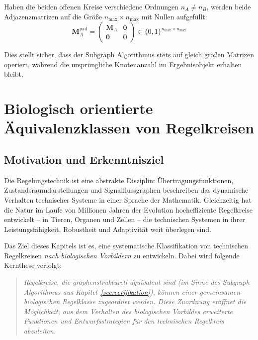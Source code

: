 \documentclass[a4paper,12pt]{article}
\theoremstyle{definition}
\begin{document}
Haben die beiden offenen Kreise verschiedene Ordnungen $n_A \neq n_B$,
werden beide Adjazenzmatrizen auf die Größe $n_{\max} \times n_{\max}$
mit Nullen aufgefüllt:
\[
\mathbf{M}_A^{\mathrm{pad}} = \begin{pmatrix} \mathbf{M}_A & \mathbf{0} \\ \mathbf{0} & \mathbf{0} \end{pmatrix} \in \{0,1\}^{n_{\max} \times n_{\max}}
\]

Dies stellt sicher, dass der Subgraph Algorithmus stets auf gleich großen
Matrizen operiert, während die ursprüngliche Knotenanzahl im Ergebnisobjekt
erhalten bleibt.

\section{Biologisch orientierte Äquivalenzklassen von Regelkreisen}
\label{sec:bio_aequivalenz}

\subsection{Motivation und Erkenntnisziel}

Die Regelungstechnik ist eine abstrakte Disziplin: Übertragungsfunktionen,
Zustandsraumdarstellungen und Signalflussgraphen beschreiben das dynamische
Verhalten technischer Systeme in einer Sprache der Mathematik. Gleichzeitig hat
die Natur im Laufe von Millionen Jahren der Evolution hocheffiziente Regelkreise
entwickelt -- in Tieren, Organen und Zellen -- die technischen Systemen in ihrer
Leistungsfähigkeit, Robustheit und Adaptivität weit überlegen sind.

Das Ziel dieses Kapitels ist es, eine systematische Klassifikation von
technischen Regelkreisen \emph{nach biologischen Vorbildern} zu entwickeln.
Dabei wird folgende Kernthese verfolgt:

\begin{quote}
	\textit{Regelkreise, die graphenstrukturell äquivalent sind (im Sinne des
		Subgraph Algorithmus aus Kapitel~\ref{sec:verifikation}), können einer
		gemeinsamen biologischen Regelklasse zugeordnet werden. Diese Zuordnung
		eröffnet die Möglichkeit, aus dem Verhalten des biologischen Vorbildes
		erweiterte Funktionen und Entwurfsstrategien für den technischen Regelkreis
		abzuleiten.}
\end{quote}
\end{document}
